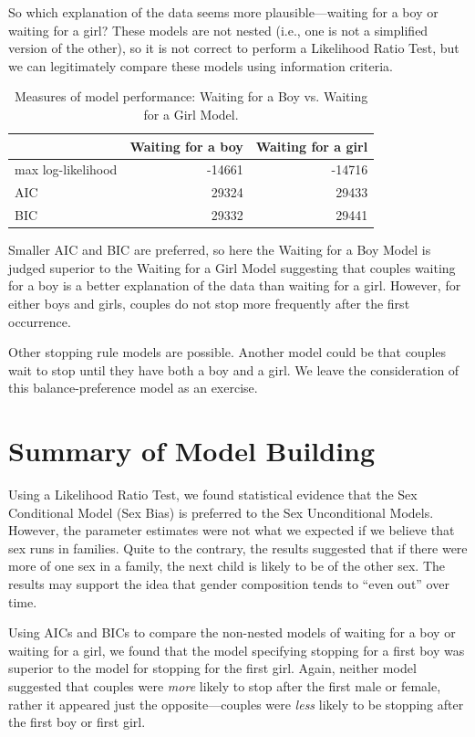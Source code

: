 \documentclass[
]{krantz}
\begin{document}
So which explanation of the data seems more plausible---waiting for a boy or waiting for a girl? These models are not nested (i.e., one is not a simplified version of the other), so it is not correct to perform a Likelihood Ratio Test, but we can legitimately compare these models using information criteria.

\begin{table}[t]

\caption{\label{tab:tab1chp2}Measures of model performance: Waiting for a Boy vs. Waiting for a Girl Model.}
\centering
\begin{tabular}{lrr}
\toprule
  & Waiting for a boy & Waiting for a girl\\
\midrule
max log-likelihood & -14661 & -14716\\
AIC & 29324 & 29433\\
BIC & 29332 & 29441\\
\bottomrule
\end{tabular}
\end{table}

Smaller AIC and BIC are preferred, so here the Waiting for a Boy Model is judged superior to the Waiting for a Girl Model suggesting that couples waiting for a boy is a better explanation of the data than waiting for a girl. However, for either boys and girls, couples do not stop more frequently after the first occurrence.

Other stopping rule models are possible. Another model could be that couples wait to stop until they have both a boy and a girl. We leave the consideration of this balance-preference model as an exercise.

\hypertarget{summary-of-model-building}{%
\section{Summary of Model Building}\label{summary-of-model-building}}

Using a Likelihood Ratio Test, we found statistical evidence that the Sex Conditional Model (Sex Bias) is preferred to the Sex Unconditional Models. However, the parameter estimates were not what we expected if we believe that sex runs in families. Quite to the contrary, the results suggested that if there were more of one sex in a family, the next child is likely to be of the other sex. The results may support the idea that gender composition tends to ``even out'' over time.

Using AICs and BICs to compare the non-nested models of waiting for a boy or waiting for a girl, we found that the model specifying stopping for a first boy was superior to the model for stopping for the first girl. Again, neither model suggested that couples were \emph{more} likely to stop after the first male or female, rather it appeared just the opposite---couples were \emph{less} likely to be stopping after the first boy or first girl.
\end{document}
